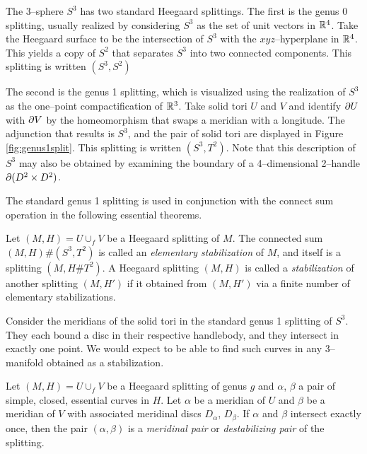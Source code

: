 \begin{ex}
	The 3--sphere $S^3$ has two standard Heegaard splittings.
	The first is the genus 0 splitting, usually realized by considering $S^3$ as the set of unit vectors in $\mathbb{R}^4$.
	Take the Heegaard surface to be the intersection of $S^3$ with the $xyz$--hyperplane in $\mathbb{R}^4$.
	This yields a copy of $S^2$ that separates $S^3$ into two connected components.
	This splitting is written $(S^3,S^2)$
	
	The second is the genus 1 splitting, which is visualized using the realization of $S^3$ as the one--point compactification of $\mathbb{R}^3$.
	Take solid tori $U$ and $V$ and identify $\partial U$ with $\partial V$ by the homeomorphism that swaps a meridian with a longitude.
	The adjunction that results is $S^3$, and the pair of solid tori are displayed in Figure \ref{fig:genus1split}.
	This splitting is written $(S^3,T^2)$.
	Note that this description of $S^3$ may also be obtained by examining the boundary of a 4--dimensional 2--handle $\partial (D^2\times D^2)$.
\end{ex}

The standard genus 1 splitting is used in conjunction with the connect sum operation in the following essential theorems.


	
\begin{defn}
	Let $(M,H)=U\cup_f V$ be a Heegaard splitting of $M$.
	The connected sum $(M,H)\#(S^3,T^2)$ is called an \emph{elementary stabilization} of $M$, and itself is a splitting $(M,H\#T^2)$.
	A Heegaard splitting $(M,H)$ is called a \emph{stabilization} of another splitting $(M,H')$ if it obtained from $(M,H')$ via a finite number of elementary stabilizations.
\end{defn}

Consider the meridians of the solid tori in the standard genus 1 splitting of $S^3$.
They each bound a disc in their respective handlebody, and they intersect in exactly one point.
We would expect to be able to find such curves in any 3--manifold obtained as a stabilization.
	
\begin{defn}	
	Let $(M,H)=U\cup_f V$ be a Heegaard splitting of genus $g$ and $\alpha$, $\beta$ a pair of simple, closed, essential curves in $H$.
	Let $\alpha$ be a meridian of $U$ and $\beta$ be a meridian of $V$ with associated meridinal discs $D_\alpha$, $D_\beta$.
	If $\alpha$ and $\beta$ intersect exactly once, then the pair $(\alpha,\beta)$ is a \emph{meridinal pair} or \emph{destabilizing pair} of the splitting.
\end{defn}

